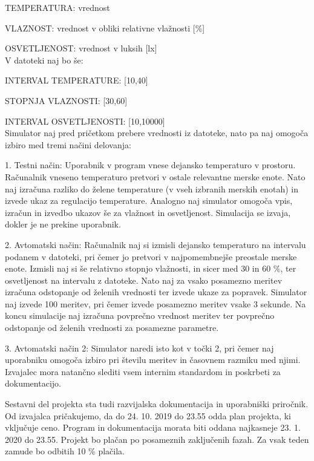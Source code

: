 \documentclass[a4paper,12pt]{article}
\begin{document}
	TEMPERATURA: vrednost 

	VLAZNOST: vrednost v obliki relativne vlažnosti [\%] 

	OSVETLJENOST: vrednost v luksih [lx] 
	\\
	V datoteki naj bo še: 

	INTERVAL TEMPERATURE: [10,40]
	
	STOPNJA VLAZNOSTI: [30,60]

	INTERVAL OSVETLJENOSTI: [10,10000] 
	\\
	Simulator naj pred pričetkom prebere 
	vrednosti iz datoteke, nato pa naj omogoča izbiro med tremi načini delovanja: 

	1. Testni način: Uporabnik v program vnese dejansko temperaturo v prostoru. Računalnik vneseno 
	temperaturo pretvori v ostale relevantne merske enote. Nato naj izračuna razliko do 
	želene temperature (v vseh izbranih merskih enotah) in izvede ukaz za regulacijo 
	temperature. Analogno naj simulator omogoča vpis, izračun in izvedbo ukazov še za 
	vlažnost in osvetljenost. Simulacija se izvaja, dokler je ne prekine uporabnik. 
	
	2. Avtomatski način: Računalnik naj si izmisli dejansko temperaturo na intervalu 
	podanem v datoteki, pri čemer jo pretvori v najpomembnejše preostale merske enote. 
	Izmisli naj si še relativno stopnjo vlažnosti, in sicer med 30 in 60 \%, ter osvetljenost 
	na intervalu z datoteke. Nato naj za vsako posamezno meritev izračuna odstopanje od 
	želenih vrednosti ter izvede ukaze za popravek. Simulator naj izvede 100 meritev, pri 
	čemer izvede posamezno meritev vsake 3 sekunde. Na koncu simulacije naj izračuna 
	povprečno vrednost meritev ter povprečno odstopanje od želenih vrednosti za posamezne 
	parametre. 

	3. Avtomatski način 2: Simulator naredi isto kot v točki 2, pri čemer 
	naj uporabniku omogoča izbiro pri številu meritev in časovnem razmiku med njimi. 
	Izvajalec mora natančno slediti vsem internim standardom in poskrbeti za dokumentacijo. 
	
	Sestavni del projekta sta tudi razvijalska dokumentacija in uporabniški priročnik. 
	Od izvajalca pričakujemo, da do 24. 10. 2019 do 23.55 odda plan projekta, ki vključuje ceno. 
	Program in dokumentacija morata biti oddana najkasneje 23. 1. 2020 do 23.55. 
	Projekt bo plačan po posameznih zaključenih fazah. Za vsak teden zamude bo odbitih 10 \% plačila. 
	\\
	
\end{document}
